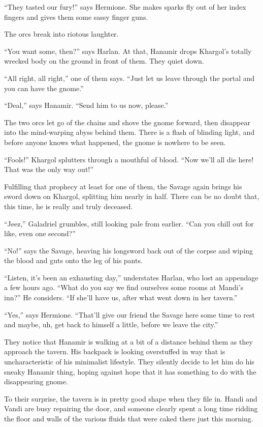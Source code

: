 \documentclass[smalldemyvopaper,11pt,twoside,onecolumn,openright,extrafontsizes]{memoir}
\newlength\drop
\begin{document}
``They tasted our fury!'' says Hermione. She makes sparks fly out of her
index fingers and gives them some sassy finger guns.

The orcs break into riotous laughter.

``You want some, then?'' says Harlan. At that, Hanamir drops Khargol's
totally wrecked body on the ground in front of them. They quiet down.

``All right, all right,'' one of them says. ``Just let us leave through
the portal and you can have the gnome.''

``Deal,'' says Hanamir. ``Send him to us now, please.''

The two orcs let go of the chains and shove the gnome forward, then
disappear into the mind-warping abyss behind them. There is a flash of
blinding light, and before anyone knows what happened, the gnome is
nowhere to be seen.

``Fools!'' Khargol splutters through a mouthful of blood. ``Now we'll
all die here! That was the only way out!''

Fulfilling that prophecy at least for one of them, the Savage again
brings his sword down on Khargol, splitting him nearly in half. There
can be no doubt that, this time, he is really and truly deceased.

``Jeez,'' Galadriel grumbles, still looking pale from earlier. ``Can you
chill out for like, even one second?''

``No!'' says the Savage, heaving his longsword back out of the corpse
and wiping the blood and guts onto the leg of his pants.

``Listen, it's been an exhausting day,'' understates Harlan, who lost an
appendage a few hours ago. ``What do you say we find ourselves some
rooms at Mandi's inn?'' He considers. ``If she'll have us, after what
went down in her tavern.''

``Yes,'' says Hermione. ``That'll give our friend the Savage here some
time to rest and maybe, uh, get back to himself a little, before we
leave the city.''

They notice that Hanamir is walking at a bit of a distance behind them
as they approach the tavern. His backpack is looking overstuffed in way
that is uncharacteristic of his minimalist lifestyle. They silently
decide to let him do his sneaky Hanamir thing, hoping against hope that
it has something to do with the disappearing gnome.

To their surprise, the tavern is in pretty good shape when they file in.
Handi and Vandi are busy repairing the door, and someone clearly spent a
long time ridding the floor and walls of the various fluids that were
caked there just this morning.
\end{document}
